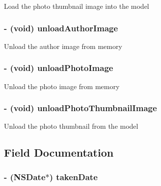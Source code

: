 \label{interface_p_b_image_a002ec7944ae9c0e779867a42af048945}
Load the photo thumbnail image into the model \hypertarget{interface_p_b_image_a309bbbd97bdb73cd5ce68b85dd10d2ef}{
\subsubsection[{unloadAuthorImage}]{\setlength{\rightskip}{0pt plus 5cm}-\/ (void) unloadAuthorImage }}
\label{interface_p_b_image_a309bbbd97bdb73cd5ce68b85dd10d2ef}
Unload the author image from memory \hypertarget{interface_p_b_image_a59d1856264f9708693f57071a56a03f5}{
\subsubsection[{unloadPhotoImage}]{\setlength{\rightskip}{0pt plus 5cm}-\/ (void) unloadPhotoImage }}
\label{interface_p_b_image_a59d1856264f9708693f57071a56a03f5}
Unload the photo image from memory \hypertarget{interface_p_b_image_a4b836242ce7c4ce1cd008a487481d6bf}{
\subsubsection[{unloadPhotoThumbnailImage}]{\setlength{\rightskip}{0pt plus 5cm}-\/ (void) unloadPhotoThumbnailImage }}
\label{interface_p_b_image_a4b836242ce7c4ce1cd008a487481d6bf}
Unload the photo thumbnail from the model 

\subsection{Field Documentation}
\hypertarget{interface_p_b_image_a9870fa11fd951bc55b7a115c227f0f97}{
\subsubsection[{takenDate}]{\setlength{\rightskip}{0pt plus 5cm}-\/ (NSDate$\ast$) {\bf takenDate}}}
\label{interface_p_b_image_a9870fa11fd951bc55b7a115c227f0f97}


